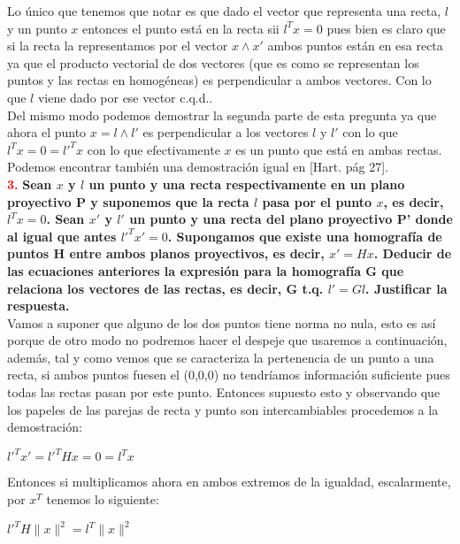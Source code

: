 \documentclass[10pt,a4paper]{article}
\begin{document}
Lo único que tenemos que notar es que dado el vector que representa una recta, $l$ y un punto $x$ entonces el punto está en la recta sii $l^Tx=0$ pues bien es claro que si la recta la representamos por el vector $x \wedge x'$ ambos puntos están en esa recta ya que el producto vectorial de dos vectores (que es como se representan los puntos y las rectas en homogéneas) es perpendicular a ambos vectores. Con lo que $l$ viene dado por ese vector c.q.d..\\

Del mismo modo podemos demostrar la segunda parte de esta pregunta ya que ahora el punto $x=l \wedge l'$ es perpendicular a los vectores $l$ y $l'$ con lo que $l^Tx = 0 = l'^Tx$ con lo que efectivamente $x$ es un punto que está en ambas rectas.\\

Podemos encontrar también una demostración igual en [Hart. pág 27].\\

\textcolor{red}{\textbf{3.}} \textbf{Sean $x$ y $l$ un punto y una recta respectivamente en un plano proyectivo P y suponemos que la recta $l$ pasa por el punto $x$, es decir, $l^Tx=0$. Sean $x'$ y $l'$ un punto y una recta del plano proyectivo P' donde al igual que antes $l'^Tx'=0$. Supongamos que existe una homografía de puntos H entre ambos planos proyectivos, es decir, $x'=Hx$. Deducir de las ecuaciones anteriores la expresión para la homografía G que relaciona los vectores de las rectas, es decir, G t.q. $l'=Gl$. Justificar la respuesta.}\\

Vamos a suponer que alguno de los dos puntos tiene norma no nula, esto es así porque de otro modo no podremos hacer el despeje que usaremos a continuación, además, tal y como vemos que se caracteriza la pertenencia de un punto a una recta, si ambos puntos fuesen el (0,0,0) no tendríamos información suficiente pues todas las rectas pasan por este punto. Entonces supuesto esto y observando que los papeles de las parejas de recta y punto son intercambiables procedemos a la demostración:\\

\begin{center}
$l'^Tx'=l'^THx = 0 = l^Tx$
\end{center}

Entonces si multiplicamos ahora en ambos extremos de la igualdad, escalarmente, por $x^T$ tenemos lo siguiente:\\

\begin{center}
$l'^TH\parallel x \parallel^2 = l^T \parallel x \parallel^2$
\end{center}
\end{document}
